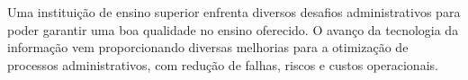 












Uma instituição de ensino superior enfrenta diversos desafios administrativos para poder garantir uma boa qualidade no ensino oferecido. O avanço da tecnologia da informação vem proporcionando diversas melhorias para a otimização de processos administrativos, com redução de falhas, riscos e custos operacionais.

